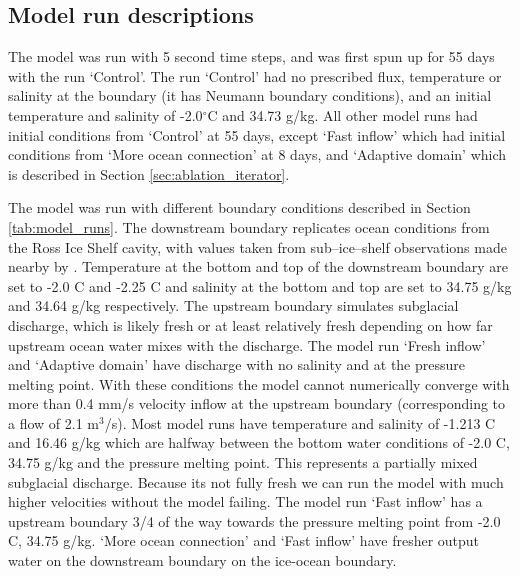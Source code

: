 \subsection{Model run descriptions} \label{sec:model_runs}

The model was run with 5 second time steps, and was first spun up for 55 days with the run `Control'. The run `Control' had no prescribed flux, temperature or salinity at the boundary (it has Neumann boundary conditions), and an initial temperature and salinity of  -2.0$^{\circ}$C  and 34.73 g/kg. All other model runs had initial conditions from `Control' at 55 days, except `Fast inflow' which had initial conditions from `More ocean connection' at 8 days, and `Adaptive domain' which is described in Section \ref{sec:ablation_iterator}.

The model was run with different boundary conditions described in Section \ref{tab:model_runs}. The downstream boundary replicates ocean conditions from the Ross Ice Shelf cavity, with values taken from sub--ice--shelf observations made nearby by \citep{robinson2020ice}. 
Temperature at the bottom and top of the downstream boundary are set to -2.0 \textdegree C and -2.25 \textdegree C and salinity at the bottom and top are set to 34.75 g/kg and 34.64 g/kg respectively. 
The upstream boundary simulates subglacial discharge, which is likely fresh or at least relatively fresh depending on how far upstream ocean water mixes with the discharge. The model run `Fresh inflow' and `Adaptive domain' have discharge with no salinity and at the pressure melting point. With these conditions the model cannot numerically converge with more than 0.4 mm/s velocity inflow at the upstream boundary (corresponding to a flow of 2.1 $\mathrm{m}^3$/s). Most model runs have temperature and salinity of -1.213 \textdegree C and 16.46 g/kg which are halfway between the bottom water conditions of -2.0 \textdegree C, 34.75 g/kg and the pressure melting point. This represents a partially mixed subglacial discharge. Because its not fully fresh we can run the model with much higher velocities without the model failing. The model run `Fast inflow' has a upstream boundary 3/4 of the way towards the pressure melting point from -2.0 \textdegree C, 34.75 g/kg. `More ocean connection' and `Fast inflow' have fresher output water on the downstream boundary on the ice-ocean boundary. 
